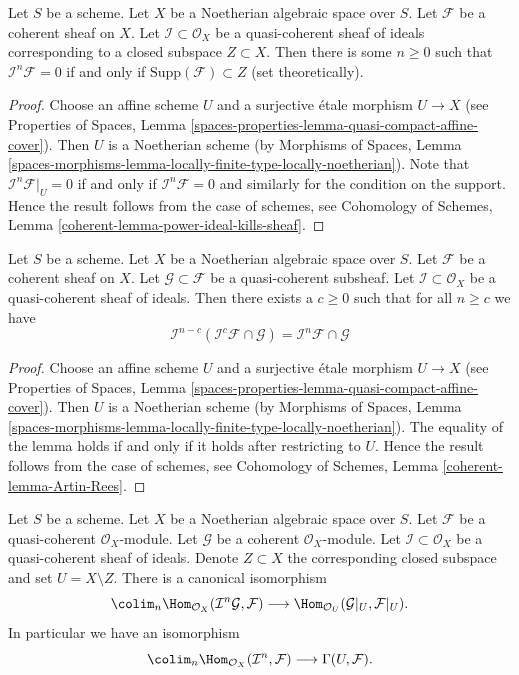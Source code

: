 \begin{lemma}
\label{lemma-power-ideal-kills-sheaf}
Let $S$ be a scheme. Let $X$ be a Noetherian algebraic space over $S$.
Let $\mathcal{F}$ be a coherent sheaf on $X$. Let
$\mathcal{I} \subset \mathcal{O}_X$ be a quasi-coherent sheaf of ideals
corresponding to a closed subspace $Z \subset X$. Then there is some
$n \geq 0$ such that $\mathcal{I}^n\mathcal{F} = 0$ if and only if
$\text{Supp}(\mathcal{F}) \subset Z$ (set theoretically).
\end{lemma}

\begin{proof}
Choose an affine scheme $U$ and a surjective \'etale morphism $U \to X$
(see Properties of Spaces, Lemma
\ref{spaces-properties-lemma-quasi-compact-affine-cover}).
Then $U$ is a Noetherian scheme (by
Morphisms of Spaces, Lemma
\ref{spaces-morphisms-lemma-locally-finite-type-locally-noetherian}).
Note that $\mathcal{I}^n\mathcal{F}|_U = 0$ if and only if
$\mathcal{I}^n\mathcal{F} = 0$ and similarly for the condition on
the support. Hence the result follows from the case of schemes, see
Cohomology of Schemes, Lemma \ref{coherent-lemma-power-ideal-kills-sheaf}.
\end{proof}

\begin{lemma}
\label{lemma-Artin-Rees}
Let $S$ be a scheme. Let $X$ be a Noetherian algebraic space over $S$.
Let $\mathcal{F}$ be a coherent sheaf on $X$. Let
$\mathcal{G} \subset \mathcal{F}$ be a quasi-coherent subsheaf.
Let $\mathcal{I} \subset \mathcal{O}_X$ be a quasi-coherent sheaf of
ideals. Then there exists a $c \geq 0$ such that for all $n \geq c$ we
have
$$
\mathcal{I}^{n - c}(\mathcal{I}^c\mathcal{F} \cap \mathcal{G})
=
\mathcal{I}^n\mathcal{F} \cap \mathcal{G}
$$
\end{lemma}

\begin{proof}
Choose an affine scheme $U$ and a surjective \'etale morphism $U \to X$
(see Properties of Spaces, Lemma
\ref{spaces-properties-lemma-quasi-compact-affine-cover}).
Then $U$ is a Noetherian scheme (by
Morphisms of Spaces, Lemma
\ref{spaces-morphisms-lemma-locally-finite-type-locally-noetherian}).
The equality of the lemma holds if and only if it holds after
restricting to $U$. Hence the result follows from the case of schemes, see
Cohomology of Schemes, Lemma \ref{coherent-lemma-Artin-Rees}.
\end{proof}

\begin{lemma}
\label{lemma-homs-over-open}
Let $S$ be a scheme. Let $X$ be a Noetherian algebraic space over $S$.
Let $\mathcal{F}$ be a quasi-coherent $\mathcal{O}_X$-module.
Let $\mathcal{G}$ be a coherent $\mathcal{O}_X$-module.
Let $\mathcal{I} \subset \mathcal{O}_X$ be a quasi-coherent sheaf of
ideals. Denote $Z \subset X$ the corresponding closed subspace and
set $U = X \setminus Z$. There is a canonical isomorphism
$$
\colim_n \Hom_{\mathcal{O}_X}(\mathcal{I}^n\mathcal{G}, \mathcal{F})
\longrightarrow
\Hom_{\mathcal{O}_U}(\mathcal{G}|_U, \mathcal{F}|_U).
$$
In particular we have an isomorphism
$$
\colim_n \Hom_{\mathcal{O}_X}(\mathcal{I}^n, \mathcal{F})
\longrightarrow
\Gamma(U, \mathcal{F}).
$$
\end{lemma}

